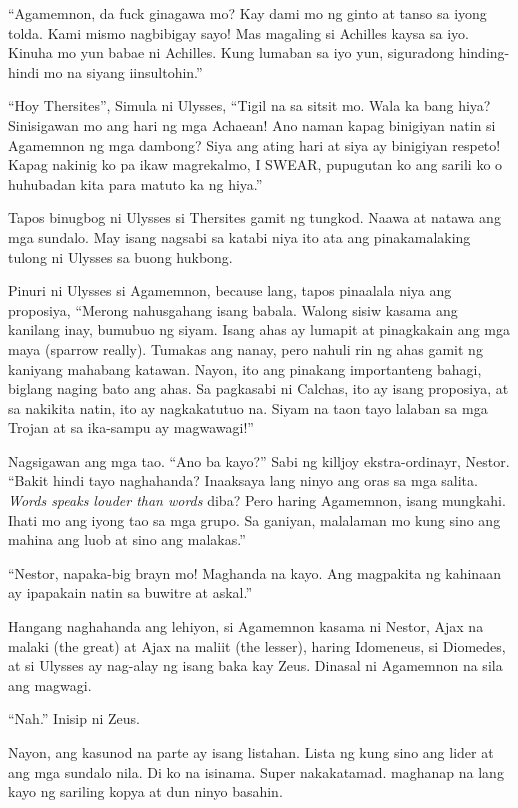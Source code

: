 \documentclass[12pt,letterpaper]{report}
\begin{document}
``Agamemnon, da fuck ginagawa mo? Kay dami mo ng ginto at tanso sa iyong tolda. Kami mismo nagbibigay sayo! Mas magaling si Achilles kaysa sa iyo. Kinuha mo yun babae ni Achilles. Kung lumaban sa iyo yun, siguradong hinding-hindi mo na siyang iinsultohin.''

``Hoy Thersites'', Simula ni Ulysses, ``Tigil na sa sitsit mo. Wala ka bang hiya? Sinisigawan mo ang hari ng mga Achaean! Ano naman kapag binigiyan natin si Agamemnon ng mga dambong? Siya ang ating hari at siya ay binigiyan respeto! Kapag nakinig ko pa ikaw magrekalmo, I SWEAR, pupugutan ko ang sarili ko o huhubadan kita para matuto ka ng hiya.''

Tapos binugbog ni Ulysses si Thersites gamit ng tungkod. Naawa at natawa ang mga sundalo. May isang nagsabi sa katabi niya ito ata ang pinakamalaking tulong ni Ulysses sa buong hukbong.

Pinuri ni Ulysses si Agamemnon, because lang, tapos pinaalala niya ang proposiya, ``Merong nahusgahang isang babala. Walong sisiw kasama ang kanilang inay, bumubuo ng siyam. Isang ahas ay lumapit at pinagkakain ang mga maya (sparrow really). Tumakas ang nanay, pero nahuli rin ng ahas gamit ng kaniyang mahabang katawan. Nayon, ito ang pinakang importanteng bahagi, biglang naging bato ang ahas. Sa pagkasabi ni Calchas, ito ay isang proposiya, at sa nakikita natin, ito ay nagkakatutuo na. Siyam na taon tayo lalaban sa mga Trojan at sa ika-sampu ay magwawagi!''

Nagsigawan ang mga tao. ``Ano ba kayo?'' Sabi ng killjoy ekstra-ordinayr, Nestor. ``Bakit hindi tayo naghahanda? Inaaksaya lang ninyo ang oras sa mga salita. \textit{Words speaks louder than words} diba? Pero haring Agamemnon, isang mungkahi. Ihati mo ang iyong tao sa mga grupo. Sa ganiyan, malalaman mo kung sino ang mahina ang luob at sino ang malakas.''

``Nestor, napaka-big brayn mo! Maghanda na kayo. Ang magpakita ng kahinaan ay ipapakain natin sa buwitre at askal.''

Hangang naghahanda ang lehiyon, si Agamemnon kasama ni Nestor, Ajax na malaki (the great) at Ajax na maliit (the lesser), haring Idomeneus, si Diomedes, at si Ulysses ay nag-alay ng isang baka kay Zeus. Dinasal ni Agamemnon na sila ang magwagi.

``Nah.'' Inisip ni Zeus.

Nayon, ang kasunod na parte ay isang listahan. Lista ng kung sino ang lider at ang mga sundalo nila. Di ko na isinama. Super nakakatamad. maghanap na lang kayo ng sariling kopya at dun ninyo basahin.
\end{document}
